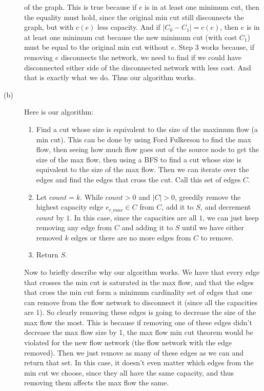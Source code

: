 \documentclass{article}
\begin{document}
\begin{description}
        of the graph. This is true because if $e$ is in at least one minimum
        cut, then the equality must hold, since the original min cut still
        disconnects the graph, but with $c(e)$ less capacity. And if
        $|C_0 - C_1| = c(e)$, then $e$ is in at least one minimum cut because
        the new minimum cut (with cost $C_1$) must be equal to the original min cut
        without $e$. Step 3 works because, if removing $e$ disconnects the
        network, we need to find if we could have disconnected either side
        of the disconnected network with less cost. And that is exactly what
        we do. Thus our algorithm works.
    \item[(b)] Here is our algorithm:
        \begin{enumerate}
            \item Find a cut whose size is equivalent to the size of the
                maximum flow (a min cut). This can be done by using Ford
                Fulkerson to find the max flow, then seeing how much flow
                goes out of the source node to get the size of the max flow,
                then using a BFS to find a cut whose size is equivalent
                to the size of the max flow. Then we can iterate over the
                edges and find the edges that cross the cut. Call this set of
                edges $C$.
            \item Let $count = k$. While $count > 0$ and $|C| > 0$,
                greedily remove the highest capacity edge $e_{c\_max} \in C$
                from $C$, add it to $S$, and decrement $count$ by $1$. In
                this case, since the capacities are all $1$, we can just keep
                removing any edge from $C$ and adding it to $S$ until we have
                either removed $k$ edges or there are no more edges from $C$
                to remove.
            \item Return $S$.
        \end{enumerate}
        Now to briefly describe why our algorithm works. We have that every
        edge that crosses the min cut is saturated in the max flow, and that the
        edges that cross the min cut form a minimum cardinality set of edges that
        one can remove from the flow network to disconnect it (since all the
        capacities are 1). So clearly removing
        these edges is going to decrease the size of the max flow the most.
        This is because if removing one of these edges didn't decrease the max
        flow size by 1, the max flow min cut theorem would be violated for the
        new flow network (the flow network with the edge removed).
        Then we just remove as many of these edges as we can and return that
        set. In this case, it doesn't even matter which edges from the min
        cut we choose, since they all have the same capacity, and thus removing
        them affects the max flow the same.
\end{description}
\end{document}

